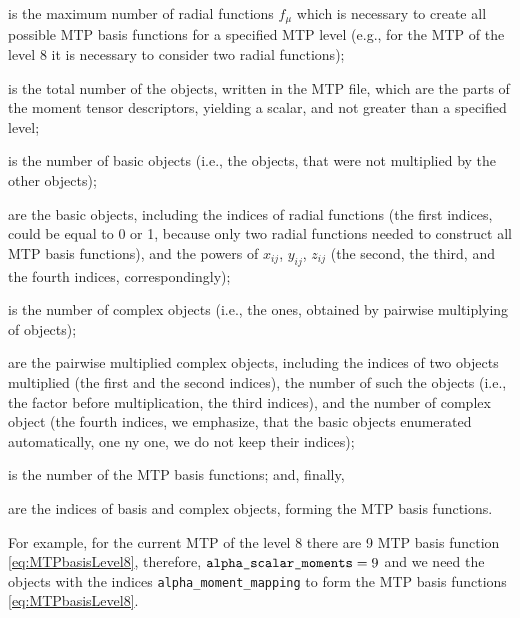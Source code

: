 \documentclass[12pt]{article}
\renewcommand{\_}{\char`_}
\begin{document}
\begin{description}[style=nextline,leftmargin=\widthof{\ttfamily XXX|},font=\normalfont\ttfamily]
	\item[radial\_funcs\_count] is the maximum number of radial functions $f_{\mu}$ which is necessary to create all possible MTP basis functions for a specified MTP level (e.g., for the MTP of the level 8 it is necessary to consider two radial functions);
	\item[alpha\_moments\_count] is the total number of the objects, written in the MTP file, which are the parts of the moment tensor descriptors, yielding a scalar, and not greater than a specified level;
	\item[alpha\_index\_basic\_count] is the number of basic objects (i.e., the objects, that were not multiplied by the other objects);
	\item[alpha\_index\_basic] are the basic objects, including the indices of radial functions (the first indices, could be equal to 0 or 1, because only two radial functions needed to construct all MTP basis functions), and the powers of $x_{ij}$, $y_{ij}$, $z_{ij}$ (the second, the third, and the fourth indices, correspondingly);
	\item[alpha\_index\_times\_count] is the number of complex objects (i.e., the ones, obtained by pairwise multiplying of objects);
	\item[alpha\_index\_times] are the pairwise multiplied complex objects, including the indices of two objects multiplied (the first and the second indices), the number of such the objects (i.e., the factor before multiplication, the third indices), and the number of complex object (the fourth indices, we emphasize, that the basic objects enumerated automatically, one ny one, we do not keep their indices); \item[alpha\_scalar\_moments] is the number of the MTP basis functions; and, finally,
	\item[alpha\_moment\_mapping] are the indices of basis and complex objects, forming the MTP basis functions.
\end{description}
For example, for the current MTP of the level 8 there are 9 MTP basis function \eqref{eq:MTPbasisLevel8}, therefore, $\verb|alpha_scalar_moments| = 9$ and we need the objects with the indices \verb|alpha_moment_mapping| to form the MTP basis functions \eqref{eq:MTPbasisLevel8}.\\
\end{document}
